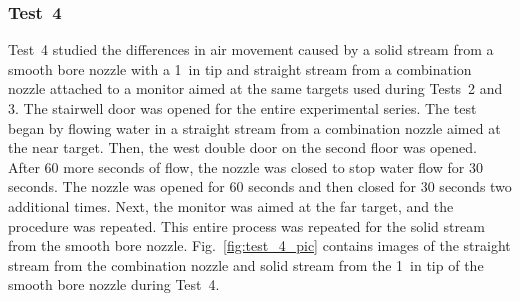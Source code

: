 \documentclass[12pt,oneside]{book}
\begin{document}
\subsubsection{Test~4}
Test~4 studied the differences in air movement caused by a solid stream from a smooth bore nozzle with a 1~in tip and straight stream from a combination nozzle attached to a monitor aimed at the same targets used during Tests~2 and 3. The stairwell door was opened for the entire experimental series. The test began by flowing water in a straight stream from a combination nozzle aimed at the near target. Then, the west double door on the second floor was opened. After 60 more seconds of flow, the nozzle was closed to stop water flow for 30 seconds. The nozzle was opened for 60 seconds and then closed for 30 seconds two additional times. Next, the monitor was aimed at the far target, and the procedure was repeated. This entire process was repeated for the solid stream from the smooth bore nozzle. Fig.~\ref{fig:test_4_pic} contains images of the straight stream from the combination nozzle and solid stream from the 1~in tip of the smooth bore nozzle during Test~4.
\end{document}
